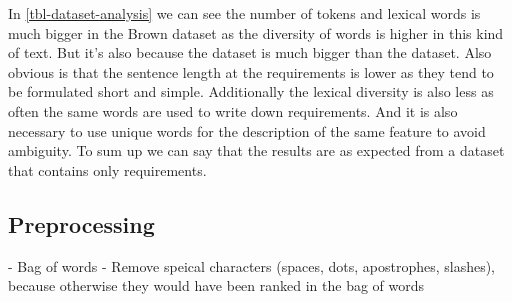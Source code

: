 In \autoref{tbl-dataset-analysis} we can see the number of tokens and lexical words is much bigger in the Brown dataset as the diversity of words is higher in this kind of text. But it's also because the dataset is much bigger than the \crowdre{} dataset. Also obvious is that the sentence length at the requirements is lower as they tend to be formulated short and simple. Additionally the lexical diversity is also less as often the same words are used to write down requirements. And it is also necessary to use unique words for the description of the same feature to avoid ambiguity. To sum up we can say that the results are as expected from a dataset that contains only requirements.


\subsection{Preprocessing} %
\label{sub:preprocessing}
- Bag of words
- Remove speical characters (spaces, dots, apostrophes, slashes), because otherwise they would have been ranked in the bag of words
